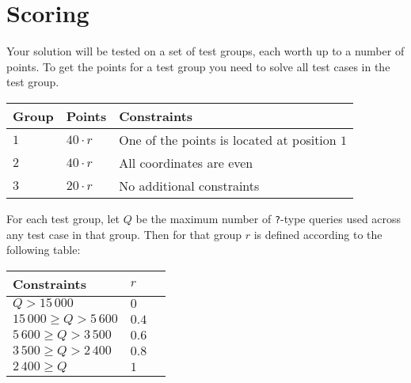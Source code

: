 \section*{Scoring}
Your solution will be tested on a set of test groups, each worth up to a number of points.
To get the points for a test group you need to solve all test cases in the test group.

\noindent
\begin{tabular}{| l | l | l |}
  \hline
  Group & Points       & Constraints \\ \hline
  $1$   & $40 \cdot r$ & One of the points is located at position $1$ \\ \hline
  $2$   & $40 \cdot r$ & All coordinates are even \\ \hline
  $3$   & $20 \cdot r$ & No additional constraints \\ \hline
\end{tabular}

For each test group, let $Q$ be the maximum number of \texttt{?}-type queries used across any test case in that group.
Then for that group $r$ is defined according to the following table:

\noindent
\begin{tabular}{| l | l | l |}
  \hline
  Constraints                & $r$ \\ \hline
  $             Q > 15\,000$ & $0$ \\ \hline
  $ 15\,000 \ge Q > 5\,600$  & $0.4$  \\ \hline
  $  5\,600 \ge Q > 3\,500$  & $0.6$  \\ \hline
  $  3\,500 \ge Q > 2\,400$  & $0.8$  \\ \hline
  $  2\,400 \ge Q$           & $1$  \\ \hline
\end{tabular}
